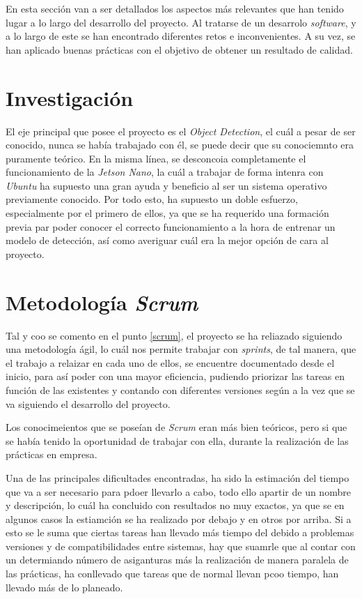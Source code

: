 
En esta sección van a ser detallados los aspectos más relevantes que han tenido lugar a lo largo del desarrollo del proyecto. Al tratarse de un desarrolo \textit{software}, y a lo largo de este se han encontrado diferentes retos e inconvenientes. A su vez, se han aplicado buenas prácticas con el objetivo de obtener un resultado de calidad.

\section{Investigación}
El eje principal que posee el proyecto es el \textit{Object Detection}, el cuál a pesar de ser conocido, nunca se había trabajado con él, se puede decir que su conociemnto era puramente teórico. En la misma línea, se desconcoia completamente el funcionamiento de la \textit{Jetson Nano}, la cuál a trabajar de forma intenra con \textit{Ubuntu} ha supuesto
una gran ayuda y beneficio al ser un sistema operativo previamente conocido.
Por todo esto, ha supuesto un doble esfuerzo, especialmente por el primero de ellos, ya que se ha requerido una formación previa par poder conocer el correcto funcionamiento a la hora de entrenar un modelo de detección, así como averiguar cuál era la mejor opción de cara al proyecto.

\clearpage
\section{Metodología \textit{Scrum}}
Tal y coo se comento en el punto \ref{scrum}, el proyecto se ha reliazado siguiendo una metodología ágil, lo cuál nos permite trabajar con \textit{sprints}, de tal manera, que el trabajo a relaizar en cada uno de ellos, se encuentre documentado desde el inicio, para así poder con una mayor eficiencia, pudiendo priorizar las tareas en función de las existentes y contando con diferentes versiones según a la vez que se va siguiendo el desarrollo del proyecto.

Los conocimeientos que se poseían de \textit{Scrum} eran más bien teóricos, pero si que se había tenido la oportunidad de trabajar con ella, durante la realización de las prácticas en empresa.

Una de las principales dificultades encontradas, ha sido la estimación del tiempo que va a ser necesario para pdoer llevarlo a cabo, todo ello apartir de un nombre y descripción, lo cuál ha concluido con resultados no muy exactos, ya que se en algunos casos la estiamción se ha realizado por debajo y en otros por arriba. Si a esto se le suma que ciertas tareas han llevado más tiempo del debido a problemas versiones y de compatibilidades entre sistemas, hay que suamrle que al contar con un determiando número de asiganturas
más la realización de manera paralela de las prácticas, ha conllevado que tareas que de normal llevan pcoo tiempo, han llevado más de lo planeado.

